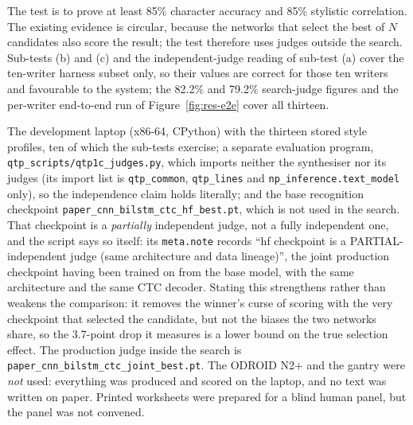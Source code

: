 
\medskip
\label{sec:res-qtp1}


            The test is to prove at least 85\% character accuracy and 85\% stylistic correlation.
            The existing evidence is circular, because the networks that select the best of $N$ candidates also score the result; the test therefore uses judges outside the search.
            Sub-tests (b) and (c) and the independent-judge reading of sub-test (a) cover the ten-writer harness subset only, so their values are correct for those ten writers and favourable to the system; the 82.2\% and 79.2\% search-judge figures and the per-writer end-to-end run of Figure~\ref{fig:res-e2e} cover all thirteen.


            The development laptop (x86-64, CPython) with the thirteen stored style profiles, ten of which the sub-tests exercise; a separate evaluation program, \texttt{qtp\_scripts/qtp1c\_judges.py}, which imports neither the synthesiser nor its judges (its import list is \texttt{qtp\_common}, \texttt{qtp\_lines} and \texttt{np\_inference.text\_model} only), so the independence claim holds literally; and the base recognition checkpoint \texttt{paper\_cnn\_bilstm\_ctc\_hf\_best.pt}, which is not used in the search.
            That checkpoint is a \emph{partially} independent judge, not a fully independent one, and the script says so itself: its \texttt{meta.note} records ``hf checkpoint is a PARTIAL-independent judge (same architecture and data lineage)'', the joint production checkpoint having been trained on from the base model, with the same architecture and the same CTC decoder.
            Stating this strengthens rather than weakens the comparison: it removes the winner's curse of scoring with the very checkpoint that selected the candidate, but not the biases the two networks share, so the 3.7-point drop it measures is a lower bound on the true selection effect.
            The production judge inside the search is \texttt{paper\_cnn\_bilstm\_ctc\_joint\_best.pt}.
            The ODROID N2+ and the gantry were \emph{not} used: everything was produced and scored on the laptop, and no text was written on paper.
            Printed worksheets were prepared for a blind human panel, but the panel was not convened.

